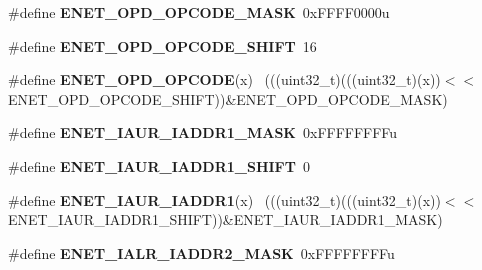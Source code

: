 \begin{DoxyCompactItemize}
\item 
\hypertarget{group___e_n_e_t___register___masks_ga91f8d538d8541612f56f3a8e42d99c92}{}\#define {\bfseries E\+N\+E\+T\+\_\+\+O\+P\+D\+\_\+\+O\+P\+C\+O\+D\+E\+\_\+\+M\+A\+S\+K}~0x\+F\+F\+F\+F0000u\label{group___e_n_e_t___register___masks_ga91f8d538d8541612f56f3a8e42d99c92}

\item 
\hypertarget{group___e_n_e_t___register___masks_ga775f746ec6513ddb5be567b51b1b8c1b}{}\#define {\bfseries E\+N\+E\+T\+\_\+\+O\+P\+D\+\_\+\+O\+P\+C\+O\+D\+E\+\_\+\+S\+H\+I\+F\+T}~16\label{group___e_n_e_t___register___masks_ga775f746ec6513ddb5be567b51b1b8c1b}

\item 
\hypertarget{group___e_n_e_t___register___masks_ga2128857e91b47535d5b1756b52edf439}{}\#define {\bfseries E\+N\+E\+T\+\_\+\+O\+P\+D\+\_\+\+O\+P\+C\+O\+D\+E}(x)                                          ~(((uint32\+\_\+t)(((uint32\+\_\+t)(x))$<$$<$E\+N\+E\+T\+\_\+\+O\+P\+D\+\_\+\+O\+P\+C\+O\+D\+E\+\_\+\+S\+H\+I\+F\+T))\&E\+N\+E\+T\+\_\+\+O\+P\+D\+\_\+\+O\+P\+C\+O\+D\+E\+\_\+\+M\+A\+S\+K)\label{group___e_n_e_t___register___masks_ga2128857e91b47535d5b1756b52edf439}

\item 
\hypertarget{group___e_n_e_t___register___masks_ga2883158c5de2f27f29274ce0251b2f81}{}\#define {\bfseries E\+N\+E\+T\+\_\+\+I\+A\+U\+R\+\_\+\+I\+A\+D\+D\+R1\+\_\+\+M\+A\+S\+K}~0x\+F\+F\+F\+F\+F\+F\+F\+Fu\label{group___e_n_e_t___register___masks_ga2883158c5de2f27f29274ce0251b2f81}

\item 
\hypertarget{group___e_n_e_t___register___masks_ga305ef40dd7fb1f6e7e0f4ba815db5210}{}\#define {\bfseries E\+N\+E\+T\+\_\+\+I\+A\+U\+R\+\_\+\+I\+A\+D\+D\+R1\+\_\+\+S\+H\+I\+F\+T}~0\label{group___e_n_e_t___register___masks_ga305ef40dd7fb1f6e7e0f4ba815db5210}

\item 
\hypertarget{group___e_n_e_t___register___masks_gacdd38c12ad9f52606f44b6507f659f6a}{}\#define {\bfseries E\+N\+E\+T\+\_\+\+I\+A\+U\+R\+\_\+\+I\+A\+D\+D\+R1}(x)                                        ~(((uint32\+\_\+t)(((uint32\+\_\+t)(x))$<$$<$E\+N\+E\+T\+\_\+\+I\+A\+U\+R\+\_\+\+I\+A\+D\+D\+R1\+\_\+\+S\+H\+I\+F\+T))\&E\+N\+E\+T\+\_\+\+I\+A\+U\+R\+\_\+\+I\+A\+D\+D\+R1\+\_\+\+M\+A\+S\+K)\label{group___e_n_e_t___register___masks_gacdd38c12ad9f52606f44b6507f659f6a}

\item 
\hypertarget{group___e_n_e_t___register___masks_gae646937c25a2d20a02a2afc7937f9f97}{}\#define {\bfseries E\+N\+E\+T\+\_\+\+I\+A\+L\+R\+\_\+\+I\+A\+D\+D\+R2\+\_\+\+M\+A\+S\+K}~0x\+F\+F\+F\+F\+F\+F\+F\+Fu\label{group___e_n_e_t___register___masks_gae646937c25a2d20a02a2afc7937f9f97}


\end{DoxyCompactItemize}
